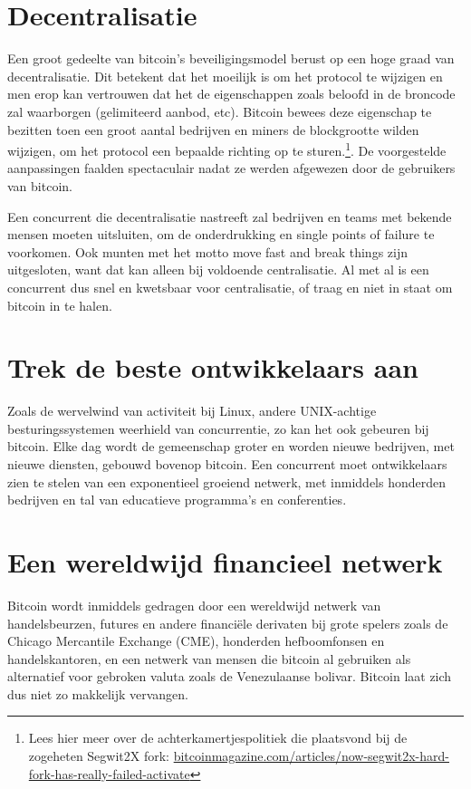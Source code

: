 \section{Decentralisatie}

Een groot gedeelte van bitcoin's beveiligingsmodel berust op een hoge graad van decentralisatie. Dit betekent dat het moeilijk is om het protocol te wijzigen en men erop kan vertrouwen dat het de eigenschappen zoals beloofd in de broncode zal waarborgen (gelimiteerd aanbod, etc). Bitcoin bewees deze eigenschap te bezitten toen een groot aantal bedrijven en miners de blockgrootte wilden wijzigen, om het protocol een bepaalde richting op te sturen.\footnote{Lees hier meer over de achterkamertjespolitiek die plaatsvond bij de zogeheten Segwit2X fork:  \href{https://bitcoinmagazine.com/articles/now-segwit2x-hard-fork-has-really-failed-activate}{bitcoinmagazine.com/articles/now-segwit2x-hard-fork-has-really-failed-activate}}. De voorgestelde aanpassingen faalden spectaculair nadat ze werden afgewezen door de gebruikers van bitcoin. 

Een concurrent die decentralisatie nastreeft zal bedrijven en teams met bekende mensen moeten uitsluiten, om de onderdrukking en \textquotedbl{}single points of failure\textquotedbl{} te voorkomen. Ook munten met het motto \textquotedbl{}move fast and break things\textquotedbl{} zijn uitgesloten, want dat kan alleen bij voldoende centralisatie. Al met al is een concurrent dus snel en kwetsbaar voor centralisatie, of traag en niet in staat om bitcoin in te halen.

\section{Trek de beste ontwikkelaars aan}

Zoals de wervelwind van activiteit bij Linux, andere UNIX-achtige besturingssystemen weerhield van concurrentie, zo kan het ook gebeuren bij bitcoin. Elke dag wordt de gemeenschap groter en worden nieuwe bedrijven, met nieuwe diensten, gebouwd bovenop bitcoin. Een concurrent moet ontwikkelaars zien te stelen van een exponentieel groeiend netwerk, met inmiddels honderden bedrijven en tal van educatieve programma's en conferenties.  

\section{Een wereldwijd financieel netwerk}

Bitcoin wordt inmiddels gedragen door een wereldwijd netwerk van handelsbeurzen, futures en andere financiële derivaten bij grote spelers zoals de Chicago Mercantile Exchange (CME), honderden hefboomfonsen en handelskantoren, en een netwerk van mensen die bitcoin al gebruiken als alternatief voor gebroken valuta zoals de Venezulaanse bolivar. Bitcoin laat zich dus niet zo makkelijk vervangen.

